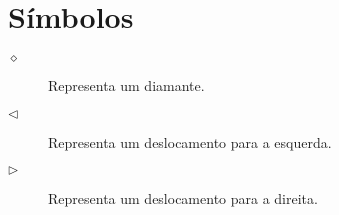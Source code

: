 \chapter*{S\'{i}mbolos}

\begin{description}
    \item[$\diamond$] Representa um diamante.
    \item[$\lhd$] Representa um deslocamento para a esquerda.
    \item[$\rhd$] Representa um deslocamento para a direita.
\end{description}
